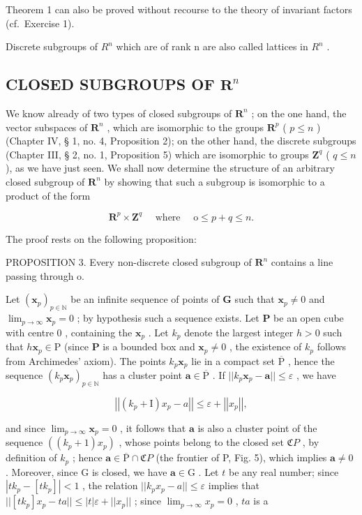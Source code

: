 Theorem 1 can also be proved without recourse to the theory of invariant factors (cf.~Exercise 1).

Discrete subgroups of \(R^{n}\) which are of rank n are also called lattices in \(R^{n}\) .

\subsection{\texorpdfstring{CLOSED SUBGROUPS OF \(\mathbf{R}^n\)}{CLOSED SUBGROUPS OF R TO THE N}}

We know already of two types of closed subgroups of \(\mathbf{R}^n\) ; on the one hand, the vector subspaces of \(\mathbf{R}^n\) , which are isomorphic to the groups \(\mathbf{R}^p\) ( \(p \leqslant n\) ) (Chapter IV, § 1, no. 4, Proposition 2); on the other hand, the discrete subgroups (Chapter III, § 2, no. 1, Proposition 5) which are isomorphic to groups \(\mathbf{Z}^q\) ( \(q \leqslant n\) ), as we have just seen. We shall now determine the structure of an arbitrary closed subgroup of \(\mathbf{R}^n\) by showing that such a subgroup is isomorphic to a product of the form

\[
\mathbf {R} ^ {p} \times \mathbf {Z} ^ {q} \quad \text { where } \quad \mathrm{o} \leqslant p + q \leqslant n.
\]

The proof rests on the following proposition:

PROPOSITION 3. Every non-discrete closed subgroup of \(\mathbf{R}^n\) contains a line passing through o.

Let \((\pmb{x}_p)_{p\in \mathbb{N}}\) be an infinite sequence of points of \(\mathbf{G}\) such that \(\pmb{x}_p\neq 0\) and \(\lim_{p\to \infty}\pmb{x}_p = 0\) ; by hypothesis such a sequence exists. Let \(\mathbf{P}\) be an open cube with centre \(0\) , containing the \(\pmb{x}_p\) . Let \(k_{p}\) denote the largest integer \(h > 0\) such that \(h\pmb{x}_p\in \mathrm{P}\) (since \(\mathbf{P}\) is a bounded box and \(\pmb{x}_p\neq 0\) , the existence of \(k_{p}\) follows from Archimedes' axiom). The points \(k_{p}\pmb{x}_{p}\) lie in a compact set \(\overline{\mathrm{P}}\) , hence the sequence \((k_{p}\pmb{x}_{p})_{p\in \mathbb{N}}\) has a cluster point \(\pmb {a}\in \overline{\mathrm{P}}\) . If \(||k_p\pmb {x}_p - \pmb {a}||\leqslant \varepsilon\) , we have

\[
\left| \left| \left(k _ {p} + \mathrm{I}\right) x _ {p} - a \right| \right| \leqslant \varepsilon + \left| \left| x _ {p} \right| \right|,
\]

and since \(\lim_{p\to \infty}\boldsymbol{x}_p = 0\) , it follows that \(\boldsymbol{a}\) is also a cluster point of the sequence \(((k_p + 1)x_p)\) , whose points belong to the closed set \(\mathfrak{C}P\) , by definition of \(k_{p}\) ; hence \(\boldsymbol{a} \in \overline{\mathrm{P}} \cap \mathfrak{C}P\) (the frontier of P, Fig. 5), which implies \(\boldsymbol{a} \neq 0\) . Moreover, since G is closed, we have \(\boldsymbol{a} \in \mathrm{G}\) . Let \(t\) be any real number; since \(|tk_p - [tk_p]| < 1\) , the relation \(||k_p x_p - a|| \leqslant \varepsilon\) implies that \(||[tk_p]x_p - ta|| \leqslant |t| \varepsilon + ||x_p||\) ; since \(\lim_{p \to \infty} x_p = 0\) , \(ta\) is a

